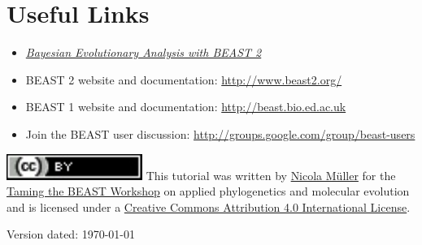 \documentclass[11pt]{article}
\begin{document}
\bigskip
\section{Useful Links}

\begin{itemize}
\item \href{http://www.beast2.org/book.html}{\textit{Bayesian Evolutionary Analysis with BEAST 2}}  \citep{BEAST2book2014}\\ \vspace{-7mm}
\item BEAST 2 website and documentation: \href{http://www.beast2.org/}{http://www.beast2.org/} \\ \vspace{-7mm}
\item BEAST 1 website and documentation: \href{http://beast.bio.ed.ac.uk}{http://beast.bio.ed.ac.uk} \\ \vspace{-7mm}
\item Join the BEAST user discussion: \href{http://groups.google.com/group/beast-users}{http://groups.google.com/group/beast-users} \\ \vspace{-7mm}
\end{itemize}


\href{http://creativecommons.org/licenses/by/4.0/}{\includegraphics[scale=0.8]{figures/ccby.pdf}} This tutorial was written by \href{https://www.bsse.ethz.ch/cevo/the-group/people/person-detail.html?persid=181412}{Nicola M\"{u}ller} for the \href{https://www.bsse.ethz.ch/cevo/taming-the-beast.html}{Taming the BEAST Workshop} on applied phylogenetics and molecular evolution and is licensed under a \href{http://creativecommons.org/licenses/by/4.0/}{Creative Commons Attribution 4.0 International License}. 



Version dated: \today



\nocite{hug07,inoue10,magallon09,marshall08,ronquist11,rutschmann07,lee09,li12,drummond07,gaut94,hasegawa89,muse92,rannala96,rannala07,sanderson97,sanderson02,sukumaran10,thorne05,yang97b,yang06,yoder00,benton03,graur04,ho07,hugall07,kishino90b,marshall90,stadler09,stadler10,stadler11,warnock12,pyron11,dosReis2012,dosReis2013,dosReis2011,arisbrosou03,arisbrosou02,baele12,baele13,benton00,brown11,Cutler2000a,Cutler2000,Darriba2013,doyle93,drummond2003,fan11,gandolfo08,Guindon2010,Hohna2012,hohna11,hasegawa85,hastings70,heath08b,heath08,Himmelmann2009,ho11,hull88,lartillot2013,lartillot2011,lartillot2012,lloyd12,lukoschek12,Morlon2011,Nylander2008,Parham2012,robinson98,rodrigo2003,shapiro11,Stadler2011,Stadler2013,Suchard2003,tajima93,Thorpe1982,weir2008,welch05,wilkinson11,xie11,Zuckerkandl1965,HeathMoore2013}


\newpage


\printbibliography[heading=relevref]
\end{document}
